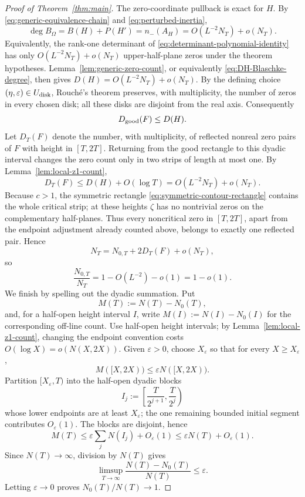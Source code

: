 \begin{proof}[Proof of Theorem~\ref{thm:main}]
The zero-coordinate pullback is exact for $H$.  By
\eqref{eq:generic-equivalence-chain} and \eqref{eq:perturbed-inertia},
\[
\deg B_\Omega
=
B(H)+P(H')
=
n_-(A_H)
=
O(L^{-2}N_T)+o(N_T).
\]
Equivalently, the rank-one determinant of
\eqref{eq:determinant-polynomial-identity} has only
$O(L^{-2}N_T)+o(N_T)$ upper-half-plane zeros under the theorem hypotheses.
Lemma~\ref{lem:generic-zero-count}, or equivalently
\eqref{eq:DH-Blaschke-degree}, then gives
$D(H)=O(L^{-2}N_T)+o(N_T)$. By the defining
choice $(\eta,\varepsilon)\in U_{\rm disk}$, Rouch\'e's theorem preserves, with
multiplicity, the number of zeros in every chosen disk; all these disks are
disjoint from the real axis. Consequently
\[
D_{\rm good}(F)\le D(H).
\]
Let $D_T(F)$ denote the number, with multiplicity, of reflected nonreal zero
pairs of $F$ with height in $[T,2T]$. Returning from the good rectangle to this
dyadic interval changes the zero count only in two strips of length at most
one. By Lemma~\ref{lem:local-z1-count},
\[
D_T(F)\le D(H)+O(\log T)=O(L^{-2}N_T)+o(N_T).
\]
Because $c>1$, the symmetric rectangle
\eqref{eq:symmetric-contour-rectangle} contains the whole critical strip; at
these heights $\zeta$ has no nontrivial zeros on the complementary half-planes.
Thus every noncritical zero in $[T,2T]$, apart from the endpoint adjustment
already counted above, belongs to exactly one reflected pair. Hence
\[
N_T=N_{0,T}+2D_T(F)+o(N_T),
\]
so
\[
\frac{N_{0,T}}{N_T}=1-O(L^{-2})-o(1)=1-o(1).
\]
We finish by spelling out the dyadic summation. Put
\[
M(T):=N(T)-N_0(T),
\]
and, for a half-open height interval $I$, write
$M(I):=N(I)-N_0(I)$ for the corresponding off-line count.
Use half-open height intervals; by Lemma~\ref{lem:local-z1-count}, changing the
endpoint convention costs $O(\log X)=o(N(X,2X))$. Given $\varepsilon>0$,
choose $X_\varepsilon$ so that for every $X\ge X_\varepsilon$,
\[
M([X,2X))\le\varepsilon N([X,2X)).
\]
Partition $[X_\varepsilon,T)$ into the half-open dyadic blocks
\[
I_j:=\left[\frac{T}{2^{j+1}},\frac{T}{2^j}\right)
\]
whose lower endpoints are at least $X_\varepsilon$; the one remaining bounded
initial segment contributes $O_\varepsilon(1)$. The blocks are disjoint, hence
\[
M(T)
\le\varepsilon\sum_jN(I_j)+O_\varepsilon(1)
\le\varepsilon N(T)+O_\varepsilon(1).
\]
Since $N(T)\to\infty$, division by $N(T)$ gives
\[
\limsup_{T\to\infty}\frac{N(T)-N_0(T)}{N(T)}\le\varepsilon.
\]
Letting $\varepsilon\to0$ proves $N_0(T)/N(T)\to1$.
\end{proof}
